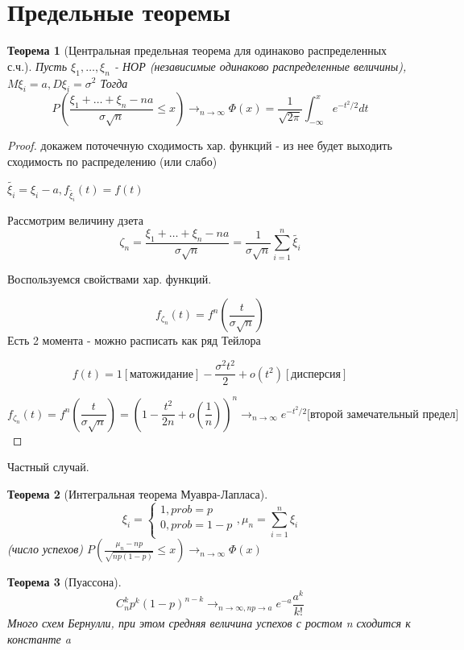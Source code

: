 \documentclass[a4paper]{article}
\newtheorem{theorem}{Теорема}[section]
\theoremstyle{definition}
\theoremstyle{remark}
\begin{document}
\section*{Предельные теоремы}
\begin{theorem}[Центральная предельная теорема для одинаково распределенных с.ч.]
    Пусть $\xi_1, \dots, \xi_n$ - НОР (независимые одинаково распределенные величины), $M\xi_i = a, D \xi_i = \sigma^2$
    Тогда 
    \[P(\frac{\xi_1 + \dots + \xi_n - na}{\sigma \sqrt{n}}\le x)\to_{n\to \infty} \Phi(x) = \frac{1}{\sqrt{2\pi}}\int_{-\infty}^x e^{-t^2/2}dt\]
\end{theorem}
\begin{proof}
    докажем поточечную сходимость хар. функций - из нее будет выходить сходимость по распределению (или слабо)

    \(\widetilde{\xi_i} = \xi_i - a, f_{\widetilde{\xi_i}}(t) = f(t)\)

    Рассмотрим величину дзета
    \[\zeta_n = \frac{\xi_1 + \dots + \xi_n - na}{\sigma \sqrt{n}} = \frac1{\sigma \sqrt{n}}\sum_{i = 1}^n \widetilde{\xi_i}\]

    Воспользуемся свойствами хар. функций.

    \[f_{\zeta_n}(t) = f^n(\frac{t}{\sigma \sqrt{n}})\]
    Есть 2 момента - можно расписать как ряд Тейлора

    \[f(t) = 1 [\text{матожидание}] -\frac{\sigma^2 t^2}{2}+o(t^2)[\text{дисперсия}]\]

    \[f_{\zeta_n}(t) = f^n(\frac{t}{\sigma \sqrt{n}}) = (1 - \frac{t^2}{2n} +o(\frac1{n}))^n\to_{n\to\infty} e^{-t^2/2}\text{[второй замечательный предел]}\]
    
\end{proof}
Частный случай.
\begin{theorem}[Интегральная теорема Муавра-Лапласа]
    \[\xi_i = \begin{cases}
        1, prob = p \\ 
        0, prob = 1- p\\
    \end{cases}, \mu_n = \sum_{i = 1}^n \xi_i\]
    (число успехов)
    $P(\frac{\mu_n - np}{\sqrt{np(1-p)}}\le x) \to_{n \to\infty}\Phi(x)$
\end{theorem}
\begin{theorem}[Пуассона]
    \[C_n^k p^k (1-p)^{n-k} \to_{n\to\infty, np\to a} e^{-a}\frac{a^k}{k!}\]
    Много схем Бернулли, при этом средняя величина успехов с ростом n сходится к константе a
\end{theorem}
\end{document}
